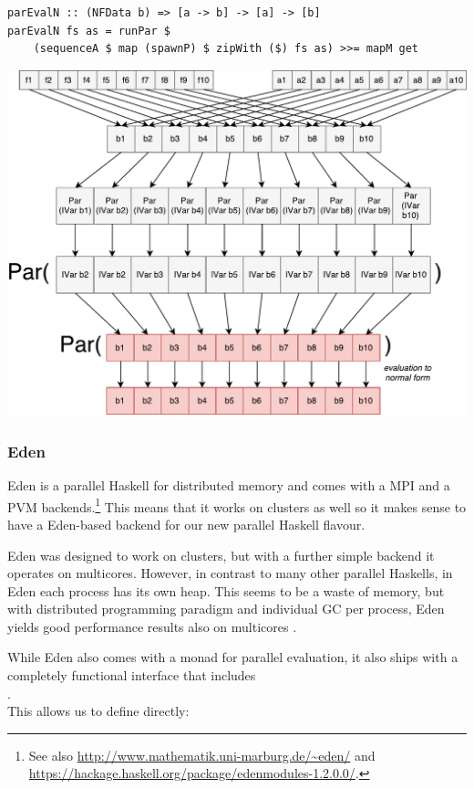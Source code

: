 \begin{lstlisting}[frame=htrbl]
parEvalN :: (NFData b) => [a -> b] -> [a] -> [b]
parEvalN fs as = runPar $ 
	(sequenceA $ map (spawnP) $ zipWith ($) fs as) >>= mapM get
\end{lstlisting}
\begin{center}
	\includegraphics[scale=0.5]{images/parEvalNParMonad}
\end{center}

\subsubsection{Eden}
Eden \cite{eden,Loogen2012} is a parallel Haskell for distributed memory and comes with a MPI and a PVM backends.\footnote{See also \url{http://www.mathematik.uni-marburg.de/~eden/} and \url{https://hackage.haskell.org/package/edenmodules-1.2.0.0/}.} This means that it works on clusters as well so it makes sense to have a Eden-based backend for our new parallel Haskell flavour.

Eden was designed to work on clusters, but with a further simple backend it operates on multicores. However, in contrast to many other parallel Haskells, in Eden each process has its own heap. This seems to be a waste of memory, but with distributed programming paradigm and individual GC per process, Eden yields good performance results also on multicores \cite{arcs-dc,no_pain}.

While Eden also comes with a monad  for parallel evaluation, it also ships with a completely functional interface that includes
\\
.
\\
This allows us to define  directly:

